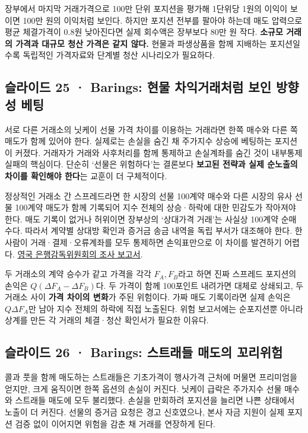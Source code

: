 \documentclass[11pt,a4paper]{article}
\begin{document}
장부에서 마지막 거래가격으로 100만 단위 포지션을 평가해 1단위당 1원의 이익이 보이면 100만 원의 이익처럼 보인다. 하지만 포지션 전부를 팔아야 하는데 매도 압력으로 평균 체결가격이 0.8원 낮아진다면 실제 회수액은 장부보다 80만 원 작다. \textbf{소규모 거래의 가격과 대규모 청산 가격은 같지 않다.} 현물과 파생상품을 함께 지배하는 포지션일수록 독립적인 가격자료와 단계별 청산 시나리오가 필요하다.\par

\subsection{슬라이드 25 · Barings: 현물 차익거래처럼 보인 방향성 베팅}
서로 다른 거래소의 닛케이 선물 가격 차이를 이용하는 거래라면 한쪽 매수와 다른 쪽 매도가 함께 있어야 한다. 실제로는 손실을 숨긴 채 주가지수 상승에 베팅하는 포지션이 커졌다. 거래자가 거래와 사후처리를 함께 통제하고 손실계좌를 숨긴 것이 내부통제 실패의 핵심이다. 단순히 ‘선물은 위험하다’는 결론보다 \textbf{보고된 전략과 실제 순노출의 차이를 확인해야 한다}는 교훈이 더 구체적이다.\par

정상적인 거래소 간 스프레드라면 한 시장의 선물 100계약 매수와 다른 시장의 유사 선물 100계약 매도가 함께 기록되어 지수 전체의 상승·하락에 대한 민감도가 작아져야 한다. 매도 기록이 없거나 허위이면 장부상의 ‘상대가격 거래’는 사실상 100계약 순매수다. 따라서 계약별 상대방 확인과 증거금 송금 내역을 독립 부서가 대조해야 한다. 한 사람이 거래·결제·오류계좌를 모두 통제하면 손익표만으로 이 차이를 발견하기 어렵다. \href{https://www.gov.uk/government/publications/report-into-the-collapse-of-barings-bank}{영국 은행감독위원회의 조사 보고서}.\par

두 거래소의 계약 승수가 같고 가격을 각각 $F_A,F_B$라고 하면 진짜 스프레드 포지션의 손익은 $Q(\Delta F_A-\Delta F_B)$다. 두 가격이 함께 100포인트 내려가면 대체로 상쇄되고, 두 거래소 사이 \textbf{가격 차이의 변화}가 주된 위험이다. 가짜 매도 기록이라면 실제 손익은 $Q\Delta F_A$만 남아 지수 전체의 하락에 직접 노출된다. 위험 보고서에는 순포지션뿐 아니라 상계를 만든 각 거래의 체결·청산 확인서가 필요한 이유다.\par

\subsection{슬라이드 26 · Barings: 스트래들 매도의 꼬리위험}
콜과 풋을 함께 매도하는 스트래들은 기초가격이 행사가격 근처에 머물면 프리미엄을 얻지만, 크게 움직이면 한쪽 옵션의 손실이 커진다. 닛케이 급락은 주가지수 선물 매수와 스트래들 매도에 모두 불리했다. 손실을 만회하려 포지션을 늘리면 나쁜 상태에서 노출이 더 커진다. 선물의 증거금 요청은 경고 신호였으나, 본사 자금 지원이 실제 포지션 검증 없이 이어지면 위험을 감춘 채 거래를 연장하게 된다.\par
\end{document}
